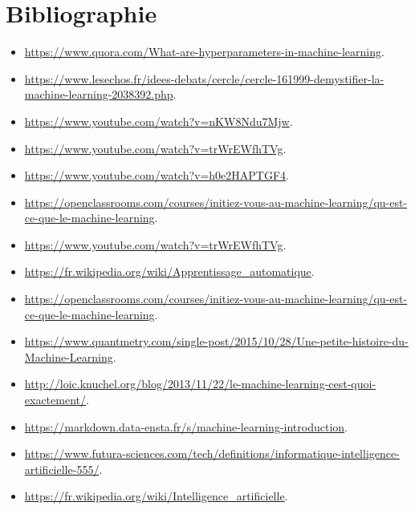 \documentclass[12pt,titlepage]{article}
\begin{document}


\section{Bibliographie}

\begin{itemize}

\sloppy
\item \url{https://www.quora.com/What-are-hyperparameters-in-machine-learning}.
\item \url{https://www.lesechos.fr/idees-debats/cercle/cercle-161999-demystifier-la-machine-learning-2038392.php}.
\item \url{https://www.youtube.com/watch?v=nKW8Ndu7Mjw}.
\item \url{https://www.youtube.com/watch?v=trWrEWfhTVg}.
\item \url{https://www.youtube.com/watch?v=h0e2HAPTGF4}.
\item \url{https://openclassrooms.com/courses/initiez-vous-au-machine-learning/qu-est-ce-que-le-machine-learning}.
\item \url{https://www.youtube.com/watch?v=trWrEWfhTVg}.
\item \url{https://fr.wikipedia.org/wiki/Apprentissage_automatique}.
\item \url{https://openclassrooms.com/courses/initiez-vous-au-machine-learning/qu-est-ce-que-le-machine-learning}.
\item \url{https://www.quantmetry.com/single-post/2015/10/28/Une-petite-histoire-du-Machine-Learning}.
\item \url{http://loic.knuchel.org/blog/2013/11/22/le-machine-learning-cest-quoi-exactement/}.
\item \url{https://markdown.data-ensta.fr/s/machine-learning-introduction}.
\item \url{https://www.futura-sciences.com/tech/definitions/informatique-intelligence-artificielle-555/}.
\item \url{https://fr.wikipedia.org/wiki/Intelligence_artificielle}.

\end{itemize}
\end{document}
